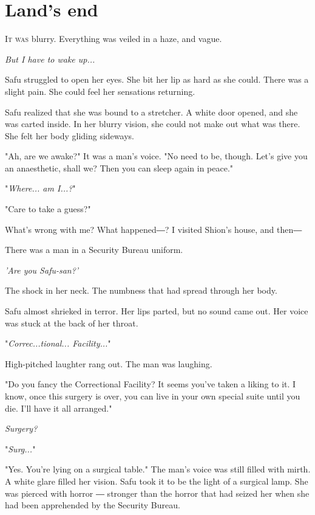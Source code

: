 
\chapter{Land's end}


\lettrine{I}{t was} blurry. Everything was veiled in a haze, and vague.

\emph{But I have to wake up...}

Safu struggled to open her eyes. She bit her lip as hard as she could.
There was a slight pain. She could feel her sensations returning.

Safu realized that she was bound to a stretcher. A white door opened,
and she was carted inside. In her blurry vision, she could not make out
what was there. She felt her body gliding sideways.

"Ah, are we awake?" It was a man's voice. "No need to be, though. Let's
give you an anaesthetic, shall we? Then you can sleep again in peace."

"\emph{Where... am I...?}"

"Care to take a guess?"

What's wrong with me? What happened―? I visited Shion's house, and then―

There was a man in a Security Bureau uniform.

\emph{'Are you Safu-san?'}

The shock in her neck. The numbness that had spread through her body.

Safu almost shrieked in terror. Her lips parted, but no sound came out.
Her voice was stuck at the back of her throat.

"\emph{Correc...tional... Facility...}"

High-pitched laughter rang out. The man was laughing.

"Do you fancy the Correctional Facility? It seems you've taken a liking
to it. I know, once this surgery is over, you can live in your own
special suite until you die. I'll have it all arranged."

\emph{Surgery?}

"\emph{Surg...}"

"Yes. You're lying on a surgical table." The man's voice was still
filled with mirth. A white glare filled her vision. Safu took it to be
the light of a surgical lamp. She was pierced with horror ― stronger
than the horror that had seized her when she had been apprehended by the
Security Bureau.

